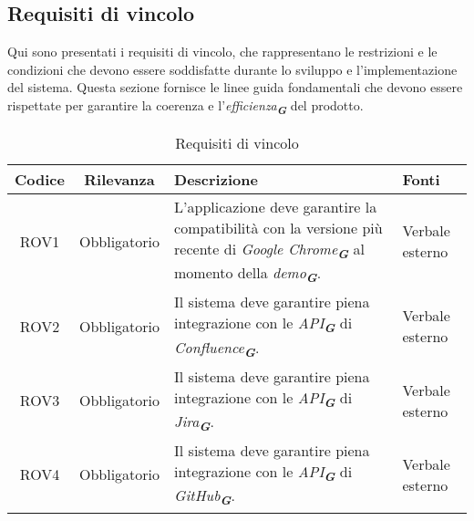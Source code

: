 \subsection{Requisiti di vincolo}
\label{sec:req_vincolo}
Qui sono presentati i requisiti di vincolo, che rappresentano le restrizioni e le condizioni
che devono essere soddisfatte durante lo sviluppo e l'implementazione del sistema. Questa
sezione fornisce le linee guida fondamentali che devono essere rispettate per garantire la
coerenza e l'\emph{efficienza}\textsubscript{\textit{\textbf{G}}} del prodotto.
\begin{table}[h!]
    \centering
    \renewcommand{\arraystretch}{1.6} %
    \begin{tabularx}{\textwidth}{|>{\centering\arraybackslash}c|>{\centering\arraybackslash}c|>{\centering\arraybackslash}X|>{\centering\arraybackslash}p{3cm}|} \hline
    \rowcolor[HTML]{FFD700} 
    \textbf{Codice} & \textbf{Rilevanza} & \textbf{Descrizione} & \textbf{Fonti} \\ \hline
    ROV1 & Obbligatorio & L'applicazione deve garantire la compatibilità con la versione più recente di \emph{Google Chrome}\textsubscript{\textit{\textbf{G}}} al momento della \emph{demo}\textsubscript{\textit{\textbf{G}}}. & Verbale esterno \\ \hline
    ROV2 & Obbligatorio & Il sistema deve garantire piena integrazione con le \emph{API}\textsubscript{\textit{\textbf{G}}} di \emph{Confluence}\textsubscript{\textit{\textbf{G}}}. & Verbale esterno \\ \hline
    ROV3 & Obbligatorio & Il sistema deve garantire piena integrazione con le \emph{API}\textsubscript{\textit{\textbf{G}}} di \emph{Jira}\textsubscript{\textit{\textbf{G}}}. & Verbale esterno\\ \hline
    ROV4 & Obbligatorio & Il sistema deve garantire piena integrazione con le \emph{API}\textsubscript{\textit{\textbf{G}}} di \emph{GitHub}\textsubscript{\textit{\textbf{G}}}. & Verbale esterno \\ \hline
    \end{tabularx}
    \caption{Requisiti di vincolo}
    \label{tab:Requisiti_di_vincolo}
\end{table}

